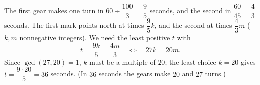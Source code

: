 The first gear makes one turn in $60\div\dfrac{100}{3}=\dfrac{9}{5}$ seconds, and the second in $\dfrac{60}{45}=\dfrac{4}{3}$ seconds. The first mark points north at times $\dfrac{9}{5}k$, and the second at times $\dfrac{4}{3}m$ ($k,m$ nonnegative integers). We need the least positive $t$ with
\[
t=\dfrac{9k}{5}=\dfrac{4m}{3}\quad\Longleftrightarrow\quad27k=20m .
\]
Since $\gcd(27,20)=1$, $k$ must be a multiple of $20$; the least choice $k=20$ gives $t=\dfrac{9\cdot20}{5}=\boxed{36}$ seconds. (In $36$ seconds the gears make $20$ and $27$ turns.)
